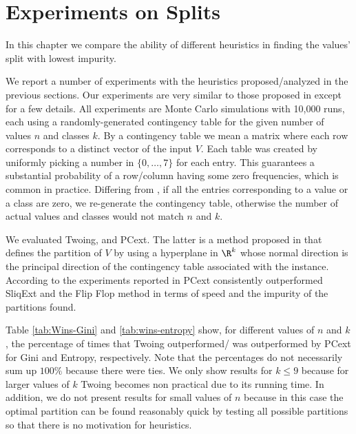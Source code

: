 \newpage

\chapter{Experiments on Splits}
\label{chap:experimentssplits}

In this chapter we compare the ability of different heuristics in finding the values' split with lowest impurity.

We report a number of experiments with the heuristics proposed/analyzed
in the previous sections.
Our experiments are very similar to those proposed in \cite{journals/datamine/CoppersmithHH99}
except for a few details.
All experiments are Monte Carlo simulations with 10,000 runs, each using a randomly-generated contingency table for the given number of values $n$ and classes $k$. 
By a contingency table we mean a matrix where each row  corresponds to a distinct vector of
the input $V$. Each table  was created by uniformly picking a number in $\{0, \ldots, 7\}$ for each entry. This guarantees a substantial probability of a row/column having some zero frequencies, which is common in practice. Differing from  \cite{journals/datamine/CoppersmithHH99}, if all the entries corresponding to a value or a class are zero, we re-generate the contingency table, otherwise the number of actual values and classes would not match $n$ and $k$.

We evaluated  Twoing, \Alg  and PCext. The latter is a method
proposed in  \cite{journals/datamine/CoppersmithHH99} that defines the partition of $V$ by using  a hyperplane
in $\R^k$ whose normal  direction is the principal direction of the 
contingency table associated with the instance.
According to the experiments reported in \cite{journals/datamine/CoppersmithHH99}  PCext
consistently  outperformed SliqExt \cite{} and the Flip Flop method \cite{}
in terms of speed and the impurity of the partitions found.

Table \ref{tab:Wins-Gini} and \ref{tab:wins-entropy} show, for different values of $n$ and $k$, the percentage of times that
Twoing outperformed/ was outperformed by PCext for Gini and Entropy, respectively.
Note that the percentages do not necessarily sum up $100\%$ because
there were ties.
We only show results for $k \leq 9$ because for larger values
of $k$ Twoing becomes non practical due to its running time. In addition,
we do not present results for small values of $n$ because in this
case the optimal  partition can be found reasonably quick by testing all possible partitions
so that there is no motivation for heuristics.

